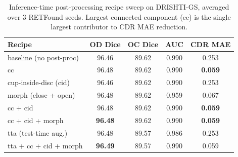 \begin{table}[t]
\centering
\caption{Inference-time post-processing recipe sweep on DRISHTI-GS, 
averaged over 3 RETFound seeds. Largest connected component (cc) is the 
single largest contributor to CDR MAE reduction.}
\label{tab:postproc}
\setlength{\tabcolsep}{6pt}
\begin{tabular}{lcccc}
\toprule
\textbf{Recipe} & \textbf{OD Dice} & \textbf{OC Dice} & \textbf{AUC} & \textbf{CDR MAE} \\
\midrule
baseline (no post-proc) & 96.46 & 89.62 & 0.990 & 0.253 \\
cc                      & 96.48 & 89.62 & 0.990 & \textbf{0.059} \\
cup-inside-disc (cid)   & 96.46 & 89.62 & 0.990 & 0.253 \\
morph (close + open)    & 96.48 & 89.62 & 0.959 & 0.067 \\
cc + cid                & 96.48 & 89.62 & 0.990 & \textbf{0.059} \\
cc + cid + morph        & \textbf{96.48} & 89.62 & 0.990 & \textbf{0.059} \\
tta (test-time aug.)    & 96.48 & 89.57 & 0.986 & 0.253 \\
tta + cc + cid + morph  & \textbf{96.49} & 89.57 & 0.990 & 0.059 \\
\bottomrule
\end{tabular}
\end{table}
